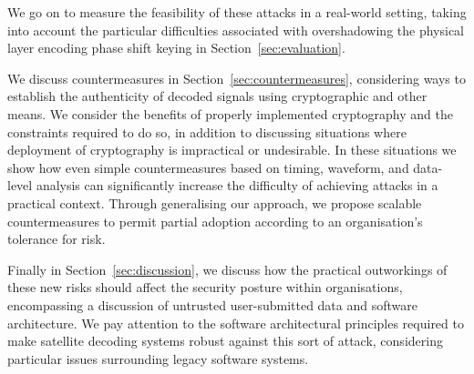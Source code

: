 
We go on to measure the feasibility of these attacks in a real-world setting, taking into account the particular difficulties associated with overshadowing the physical layer encoding phase shift keying in Section~\ref{sec:evaluation}.

We discuss countermeasures in Section~\ref{sec:countermeasures}, considering ways to establish the authenticity of decoded signals using cryptographic and other means.
We consider the benefits of properly implemented cryptography and the constraints required to do so, in addition to discussing situations where deployment of cryptography is impractical or undesirable.
In these situations we show how even simple countermeasures based on timing, waveform, and data-level analysis can significantly increase the difficulty of achieving attacks in a practical context.
Through generalising our approach, we propose scalable countermeasures to permit partial adoption according to an organisation's tolerance for risk.

Finally in Section~\ref{sec:discussion}, we discuss how the practical outworkings of these new risks should affect the security posture within organisations, encompassing a discussion of untrusted user-submitted data and software architecture.
We pay attention to the software architectural principles required to make satellite decoding systems robust against this sort of attack, considering particular issues surrounding legacy software systems.
